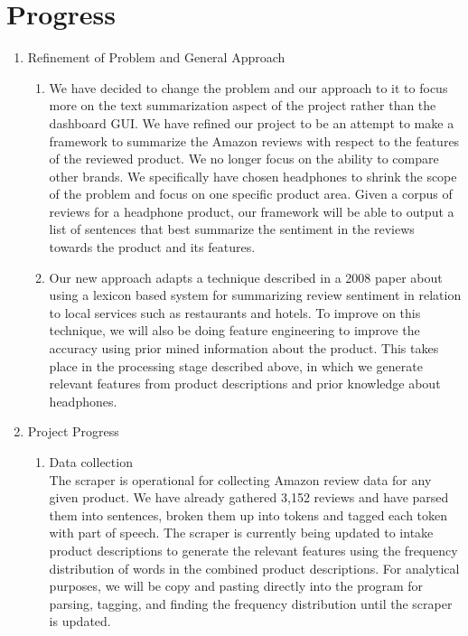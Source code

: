\documentclass{article}
\begin{document}
\section{Progress}
\begin{enumerate}
\item Refinement of Problem and General Approach
	\begin{enumerate} [label* = \arabic*.]
	\item We have decided to change the problem and our approach to it to focus more on the text summarization aspect of the project rather than the dashboard GUI. We have refined our project to be an attempt to make a framework to summarize the Amazon reviews with respect to the features of the reviewed product. We no longer focus on the ability to compare other brands. We specifically have chosen headphones to shrink the scope of the problem and focus on one specific product area. Given a corpus of reviews for a headphone product, our framework will be able to output a list of sentences that best summarize the sentiment in the reviews towards the product and its features.
	\item Our new approach adapts a technique described in a 2008 paper about using a lexicon based system for summarizing review sentiment in relation to local services such as restaurants and hotels. To improve on this technique, we will also be doing feature engineering to improve the accuracy using prior mined information about the product. This takes place in the processing stage described above, in which we generate relevant features from product descriptions and prior knowledge about headphones.
	\end{enumerate}
\item Project Progress 
	\begin{enumerate} [label* = \arabic*.]
	\item Data collection \\
	The scraper is operational for collecting Amazon review data for any given product. We have already gathered 3,152 reviews and have parsed them into sentences, broken them up into tokens and tagged each token with part of speech. The scraper is currently being updated to intake product descriptions to generate the relevant features using the frequency distribution of words in the combined product descriptions. For analytical purposes, we will be copy and pasting directly into the program for parsing, tagging, and finding the frequency distribution until the scraper is updated. 
	\end{enumerate} 

\end{enumerate}
\end{document}

